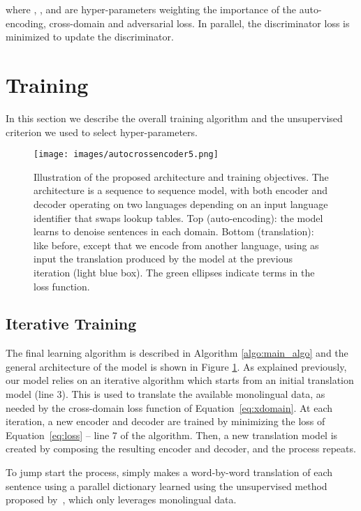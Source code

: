 \documentclass{article} \usepackage{iclr2018_conference,times}
\begin{document}
where , , and  are hyper-parameters weighting the importance of the auto-encoding, cross-domain and adversarial loss. In parallel, the discriminator loss  is minimized to update the discriminator.
  \section{Training}
In this section we describe the overall training algorithm and the unsupervised criterion we used to select hyper-parameters.

\begin{figure}[!t]
\begin{center}
\texttt{[image: images/autocrossencoder5.png]}
\end{center}
\caption{Illustration of the proposed architecture and training objectives. The architecture is a sequence to sequence model, with both encoder and decoder operating on two languages depending on an input language identifier that swaps lookup tables.
Top (auto-encoding): the model learns to denoise sentences in each domain. Bottom (translation): like before, except that we encode from another language, using as input the translation produced by the model at the previous iteration (light blue box). The green ellipses indicate terms in the loss function.}
\label{fig:model_outline1}
\end{figure}
\subsection{Iterative Training }


The final learning algorithm is described in Algorithm \ref{algo:main_algo} and the general architecture of the model is shown in Figure \ref{fig:model_outline1}. As explained previously, our model relies on an iterative algorithm which starts from an initial translation model  (line 3). This is used to translate the available monolingual data, as needed by the cross-domain loss function of Equation~\ref{eq:xdomain}.
At each iteration, a new encoder and decoder are trained by minimizing the loss of Equation~\ref{eq:loss} -- line 7 of the algorithm. Then, a new translation model  is created by composing the resulting encoder and decoder, and the process repeats.

To jump start the process,  simply makes a word-by-word translation of each sentence using a parallel dictionary learned using the unsupervised method proposed by~\citet{wordalign17}, which only leverages monolingual data.
\end{document}
